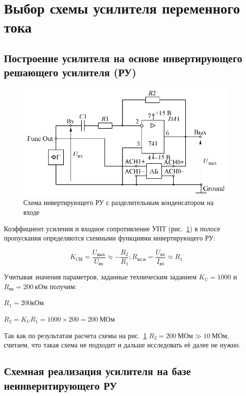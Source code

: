 \section{Выбор схемы усилителя переменного тока}

\subsection{Построение усилителя на основе инвертирующего решающего усилителя (РУ)}

\begin{figure}[H]
	\centering
	\includegraphics[width=0.7\linewidth]{photo/invertring_py}
	\caption{Схема инвертирующего РУ с разделительным конденсатором на входе}
	\label{fig:invertring_py}
\end{figure}

Коэффициент усиления и входное сопротивление УПТ
(рис.~\ref{fig:invertring_py}) в полосе пропускания определяются схемными 
функциями инвертирующего РУ:

$$ 
K_{UИ} = \dfrac{U_{вых}}{U_{вх}} \approx -\dfrac{R_2}{R_1}; 
R_{вх. и} = \dfrac{U_{вх}}{I_{вх}} \approx R_1
$$

Учитывая значения параметров, заданные техническим заданием 
$ K_U = 1000 $ и $ R_{вх} = 200~кОм $ 
получим:

$ R_1 = 200 кОм $

$ R_2 = K_U R_1 = 1000 \times 200 = 200~МОм $

Так как по результатам расчета схемы на 
рис.~\ref{fig:invertring_py}
$ R_2 = 200~МОм \gg 10~МОм $,
считаем, что такая схема не подходит 
и дальше исследовать её далее не нужно.

\subsection{Схемная реализация усилителя на базе неинвернтирующего РУ}

